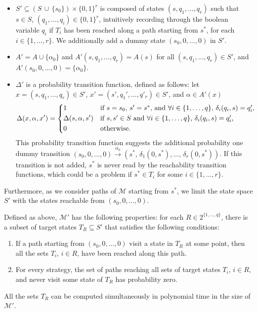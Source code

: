 \begin{itemize}
  \item $S' \subseteq (S\, \cup\, \{s_0\}) \times \{0, 1\}^r$ is composed of states $(s, q_1, \dots, q_r)$ such that $s \in S$, $(q_1, \dots, q_i) \in \{0, 1\}^r$, intuitively recording through the boolean variable $q_i$ if $T_i$ has been reached along a path starting from $s^*$, for each $i \in \{1, \dots, r\}$.
  We additionally add a dummy state $(s_0, 0, \dots,0)$ in $S'$.
  \item $A' = A \cup \{\alpha_0\}$ and $A'(s, q_1, \dots, q_r) = A(s)$ for all $(s, q_1, \dots, q_r) \in S'$, and $A'(s_0, 0, \dots, 0) = \{\alpha_0\}$.
  \item $\Delta'$ is a probability transition function, defined as follows: let $x=(s, q_1, \dots, q_r) \in S'$, $x' = (s', q_1', \dots, q'_r) \in S'$, and $\alpha \in A'(x)$
  \[
  \Delta(x, \alpha, x') = \begin{dcases*}
    1 & if $s = s_0$, $s'=s^*$, and $\forall i \in \{1, \dots, q\}$, $\delta_i(q_i, s) = q'_i$, \\
    \Delta(s, \alpha, s') & if $s, s'\in S$ and  $\forall i \in \{1, \dots, q\}$, $\delta_i(q_i, s) = q'_i$,\\
    0 & otherwise.
  \end{dcases*}
  \]
  This probability transition function suggests the additional probability one dummy transition $(s_0, 0, \dots, 0) \xrightarrow{\alpha_0} (s^*,\, \delta_1(0, s^*), \dots,\, \delta_r(0, s^*))$.
  If this transition is not added, $s^*$ is never read by the reachability transition functions, which could be a problem if $s^* \in T_i$ for some $i \in \{1, \dots, r\}$.
\end{itemize}
Furthermore, as we consider paths of $\mathcal{M}$ starting from $s^*$, we limit the state space $S'$ with the states reachable from $(s_0, 0, \dots, 0)$.
\begin{lemma} \label{MOSR-lemme}
Defined as above, $\mathcal{M}'$ has the following properties: for each $R \in 2^{\{1, \dots, q\}}$, there is a subset of target states $T_R \subseteq S'$ that satisfies the following conditions:
\begin{enumerate}
  \item If a path starting from $(s_0, 0, \dots, 0)$ visit a state in $T_R$ at some point, then
  all the sets $T_i$, $i \in R$, have been reached along this path.
  \label{Mprime1}
  \item For every strategy, the set of paths reaching all sets of target states $T_i$, $i \in R$, and never visit some state of $T_R$ has probability zero. \label{Mprime2}
\end{enumerate}
All the sets $T_R$ can be computed simultaneously
in polynomial time in the size of $\mathcal{M}'$.
\end{lemma}

